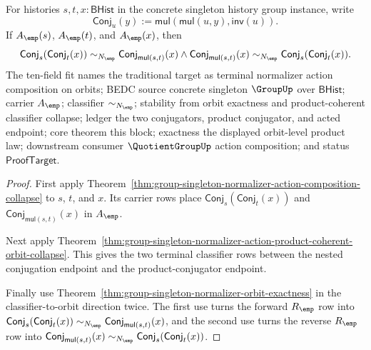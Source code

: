\begin{theorem}
\label{thm:group-singleton-normalizer-action-product-coherent-orbit-law}
For histories $s,t,x:\mathsf{BHist}$ in the concrete singleton history group
instance, write
$$
\mathsf{Conj}_u(y):=\mathsf{mul}(\mathsf{mul}(u,y),\mathsf{inv}(u)).
$$
If $A_{\emp}(s)$, $A_{\emp}(t)$, and $A_{\emp}(x)$, then
$$
\mathsf{Conj}_s(\mathsf{Conj}_t(x))\sim_{N_{\emp}}
\mathsf{Conj}_{\mathsf{mul}(s,t)}(x)
\land
\mathsf{Conj}_{\mathsf{mul}(s,t)}(x)\sim_{N_{\emp}}
\mathsf{Conj}_s(\mathsf{Conj}_t(x)).
$$
The ten-field fit names the traditional target as terminal normalizer action
composition on orbits; BEDC source concrete singleton $\GroupUp$ over
$\mathsf{BHist}$; carrier $A_{\emp}$; classifier $\sim_{N_{\emp}}$; stability
from orbit exactness and product-coherent classifier collapse; ledger the two
conjugators, product conjugator, and acted endpoint; core theorem this block;
exactness the displayed orbit-level product law; downstream consumer
$\QuotientGroupUp$ action composition; and status $\mathsf{ProofTarget}$.
\end{theorem}
\begin{proof}
First apply
Theorem~\ref{thm:group-singleton-normalizer-action-composition-collapse} to
$s$, $t$, and $x$. Its carrier rows place
$\mathsf{Conj}_s(\mathsf{Conj}_t(x))$ and
$\mathsf{Conj}_{\mathsf{mul}(s,t)}(x)$ in $A_{\emp}$.

Next apply
Theorem~\ref{thm:group-singleton-normalizer-action-product-coherent-orbit-collapse}.
This gives the two terminal classifier rows between the nested conjugation
endpoint and the product-conjugator endpoint.

Finally use Theorem~\ref{thm:group-singleton-normalizer-orbit-exactness} in the
classifier-to-orbit direction twice. The first use turns the forward
$R_{\emp}$ row into
$\mathsf{Conj}_s(\mathsf{Conj}_t(x))\sim_{N_{\emp}}
\mathsf{Conj}_{\mathsf{mul}(s,t)}(x)$, and the second use turns the reverse
$R_{\emp}$ row into
$\mathsf{Conj}_{\mathsf{mul}(s,t)}(x)\sim_{N_{\emp}}
\mathsf{Conj}_s(\mathsf{Conj}_t(x))$.
\end{proof}

